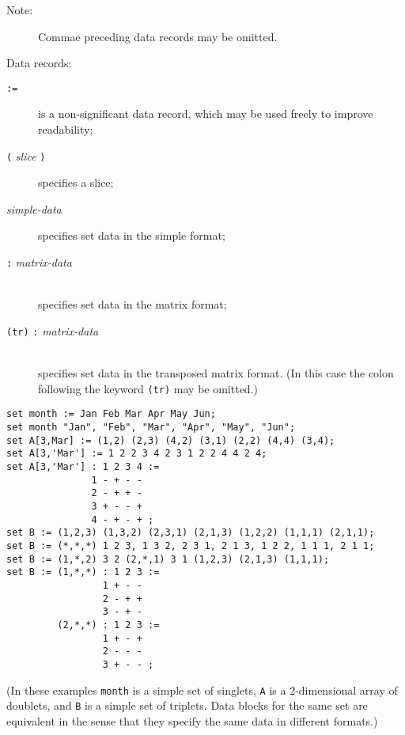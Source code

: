 \documentclass[10pt]{article}
\begin{document}
\begin{description}
\item[{\rm Note:}\hspace*{31pt}] Commae preceding data records may be
omitted.
\end{description}

\noindent Data records:

\begin{description}
\item[{\tt :=}\hspace*{45pt}] is a non-significant data record, which
may be used freely to improve readability;
\item[{\tt(} {\it slice} {\tt)}\hspace*{18.5pt}] specifies a slice;
\item[{\it simple-data}\hspace*{5.5pt}] specifies set data in the
simple format;
\item[{\tt:} {\it matrix-data}]\hspace*{0pt}\\
specifies set data in the matrix format;
\item[{\tt(tr)} {\tt:} {\it matrix-data}]\hspace*{0pt}\\
specifies set data in the transposed matrix format. (In this case the
colon following the keyword {\tt(tr)} may be omitted.)
\end{description}


\begin{verbatim}
set month := Jan Feb Mar Apr May Jun;
set month "Jan", "Feb", "Mar", "Apr", "May", "Jun";
set A[3,Mar] := (1,2) (2,3) (4,2) (3,1) (2,2) (4,4) (3,4);
set A[3,'Mar'] := 1 2 2 3 4 2 3 1 2 2 4 4 2 4;
set A[3,'Mar'] : 1 2 3 4 :=
               1 - + - -
               2 - + + -
               3 + - - +
               4 - + - + ;
set B := (1,2,3) (1,3,2) (2,3,1) (2,1,3) (1,2,2) (1,1,1) (2,1,1);
set B := (*,*,*) 1 2 3, 1 3 2, 2 3 1, 2 1 3, 1 2 2, 1 1 1, 2 1 1;
set B := (1,*,2) 3 2 (2,*,1) 3 1 (1,2,3) (2,1,3) (1,1,1);
set B := (1,*,*) : 1 2 3 :=
                 1 + - -
                 2 - + +
                 3 - + -
         (2,*,*) : 1 2 3 :=
                 1 + - +
                 2 - - -
                 3 + - - ;
\end{verbatim}

\noindent(In these examples {\tt month} is a simple set of singlets,
{\tt A} is a 2-dimensional array of doublets, and {\tt B} is a simple
set of triplets. Data blocks for the same set are equivalent in the
sense that they specify the same data in different formats.)
\end{document}
